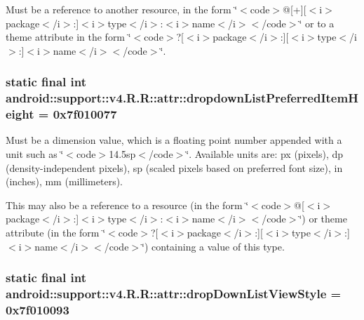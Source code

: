 Must be a reference to another resource, in the form \char`\"{}$<$code$>$@\mbox{[}+\mbox{]}\mbox{[}$<$i$>$package$<$/i$>$:\mbox{]}$<$i$>$type$<$/i$>$:$<$i$>$name$<$/i$>$$<$/code$>$\char`\"{} or to a theme attribute in the form \char`\"{}$<$code$>$?\mbox{[}$<$i$>$package$<$/i$>$:\mbox{]}\mbox{[}$<$i$>$type$<$/i$>$:\mbox{]}$<$i$>$name$<$/i$>$$<$/code$>$\char`\"{}. \hypertarget{classandroid_1_1support_1_1v4_1_1_r_1_1attr_a38ee74775fd716e462d4eda74ca02f1}{
\subsubsection[{dropdownListPreferredItemHeight}]{\setlength{\rightskip}{0pt plus 5cm}static final int android::support::v4.R.R::attr::dropdownListPreferredItemHeight = 0x7f010077}}
\label{classandroid_1_1support_1_1v4_1_1_r_1_1attr_a38ee74775fd716e462d4eda74ca02f1}


Must be a dimension value, which is a floating point number appended with a unit such as \char`\"{}$<$code$>$14.5sp$<$/code$>$\char`\"{}. Available units are: px (pixels), dp (density-independent pixels), sp (scaled pixels based on preferred font size), in (inches), mm (millimeters). 

This may also be a reference to a resource (in the form \char`\"{}$<$code$>$@\mbox{[}$<$i$>$package$<$/i$>$:\mbox{]}$<$i$>$type$<$/i$>$:$<$i$>$name$<$/i$>$$<$/code$>$\char`\"{}) or theme attribute (in the form \char`\"{}$<$code$>$?\mbox{[}$<$i$>$package$<$/i$>$:\mbox{]}\mbox{[}$<$i$>$type$<$/i$>$:\mbox{]}$<$i$>$name$<$/i$>$$<$/code$>$\char`\"{}) containing a value of this type. \hypertarget{classandroid_1_1support_1_1v4_1_1_r_1_1attr_671639976fd73cafb18ccb72fd6be3e7}{
\subsubsection[{dropDownListViewStyle}]{\setlength{\rightskip}{0pt plus 5cm}static final int android::support::v4.R.R::attr::dropDownListViewStyle = 0x7f010093}}
\label{classandroid_1_1support_1_1v4_1_1_r_1_1attr_671639976fd73cafb18ccb72fd6be3e7}


